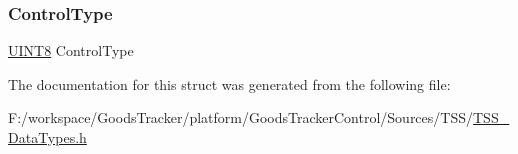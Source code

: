\subsubsection{\texorpdfstring{Control\+Type}{ControlType}}
{\footnotesize\ttfamily \hyperlink{_t_s_s___data_types_8h_ab27e9918b538ce9d8ca692479b375b6a}{U\+I\+N\+T8} Control\+Type}



The documentation for this struct was generated from the following file\+:\begin{DoxyCompactItemize}
\item 
F\+:/workspace/\+Goods\+Tracker/platform/\+Goods\+Tracker\+Control/\+Sources/\+T\+S\+S/\hyperlink{_t_s_s___data_types_8h}{T\+S\+S\+\_\+\+Data\+Types.\+h}\end{DoxyCompactItemize}
